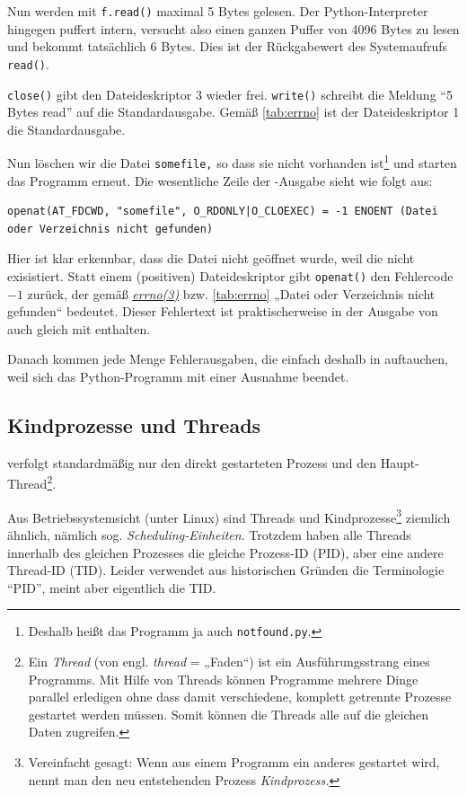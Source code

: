 Nun werden mit \texttt{f.read()} maximal 5 Bytes gelesen. Der Python-Interpreter hingegen puffert
intern, versucht also einen ganzen Puffer von 4096 Bytes zu lesen und bekommt tatsächlich 6 Bytes.
Dies ist der Rückgabewert des Systemaufrufs \texttt{read()}.

\texttt{close()} gibt den Dateideskriptor 3 wieder frei. \texttt{write()} schreibt die Meldung "`5
Bytes read"' auf die Standardausgabe. Gemäß \autoref{tab:errno} ist der Dateideskriptor 1 die
Standardausgabe.


Nun löschen wir die Datei \texttt{somefile,} so dass sie nicht vorhanden ist\footnote{Deshalb heißt
das Programm ja auch \texttt{notfound.py}.} und starten das Programm erneut. Die wesentliche
Zeile der \strace-Ausgabe sieht wie folgt aus:

\begin{lstlisting}
openat(AT_FDCWD, "somefile", O_RDONLY|O_CLOEXEC) = -1 ENOENT (Datei oder Verzeichnis nicht gefunden)
\end{lstlisting}

Hier ist klar erkennbar, dass die Datei nicht geöffnet wurde, weil die nicht exisistiert. Statt
einem (positiven) Dateideskriptor gibt \texttt{openat()} den Fehlercode $-1$ zurück, der gemäß
\href{http://man7.org/linux/man-pages/man3/errno.3.html}{\emph{errno(3)}} bzw. \autoref{tab:errno}
„Datei oder Verzeichnis nicht gefunden“ bedeutet. Dieser Fehlertext ist praktischerweise in der
Ausgabe von \strace{} auch gleich mit enthalten.

Danach kommen jede Menge Fehlerausgaben, die einfach deshalb in \strace{} auftauchen, weil sich das
Python-Programm mit einer Ausnahme beendet.

\subsection{Kindprozesse und Threads}

\strace{} verfolgt standardmäßig nur den direkt gestarteten Prozess und den
Haupt-Thread\footnote{Ein \emph{Thread} (von engl. \emph{thread} = „Faden“) ist ein
Ausführungsstrang eines Programms. Mit Hilfe von Threads können Programme mehrere Dinge parallel
erledigen ohne dass damit verschiedene, komplett getrennte Prozesse gestartet werden müssen. Somit
können die Threads alle auf die gleichen Daten zugreifen.}.

Aus Betriebssystemsicht (unter Linux) sind Threads und Kindprozesse\footnote{Vereinfacht gesagt:
Wenn aus einem Programm ein anderes gestartet wird, nennt man den neu entstehenden Prozess
\emph{Kindprozess.}} ziemlich ähnlich, nämlich sog. \emph{Scheduling-Einheiten}. Trotzdem haben
alle Threads innerhalb des gleichen Prozesses die gleiche Prozess-ID (PID), aber eine andere
Thread-ID (TID). Leider verwendet \strace{} aus historischen Gründen die Terminologie "`PID"', meint
aber eigentlich die TID.

